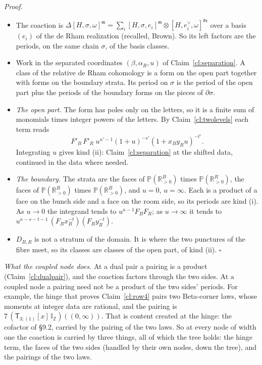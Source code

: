\documentclass[11pt]{article}
\newcommand{\sT}{\mathsf T}
\newcommand{\IZ}{\mathbb I_{\mathbb Z}}
\newcommand{\Tx}[3]{(\sT_{#1;(1)}[x]\,#2)((#3,\infty))}
\theoremstyle{plain}
\theoremstyle{remark}
\begin{document}
\emph{Proof.}
\begin{itemize}
\item The coaction is $\Delta[H,\sigma,\omega]^{\mathfrak m}=\sum_i[H,\sigma,e_i]^{\mathfrak m}\otimes[H,e_i^\vee,\omega]^{\mathfrak{dr}}$ over a basis $(e_i)$ of the de Rham realization (recalled, Brown). So its left factors are the periods, on the same chain $\sigma$, of the basis classes.
\item Work in the separated coordinates $(\beta,\alpha_R,u)$ of Claim~\ref{cl:separation}. A class of the relative de Rham cohomology is a form on the open part together with forms on the boundary strata. Its period on $\sigma$ is the period of the open part plus the periods of the boundary forms on the pieces of $\partial\sigma$.
\item \emph{The open part.} The form has poles only on the letters, so it is a finite sum of monomials times integer powers of the letters. By Claim~\ref{cl:twolevels} each term reads
\[
F'_B\,F'_R\;u^{\kappa'-1}(1+u)^{-s'}(1+x_By_Ru)^{-t'}.
\]
Integrating $u$ gives kind (ii): Claim~\ref{cl:separation} at the shifted data, continued in the data where needed.
\item \emph{The boundary.} The strata are the faces of $\mathbb P(\mathbb R^B_{>0})$ times $\mathbb P(\mathbb R^R_{>0})$, the faces of $\mathbb P(\mathbb R^R_{>0})$ times $\mathbb P(\mathbb R^B_{>0})$, and $u=0$, $u=\infty$. Each is a product of a face on the bunch side and a face on the room side, so its periods are kind (i). As $u\to0$ the integrand tends to $u^{\kappa-1}F_BF_R$; as $u\to\infty$ it tends to $u^{\kappa-s-t-1}\,(F_Bx_B^{-t})(F_Ry_R^{-t})$.
\item $D_{B,R}$ is not a stratum of the domain. It is where the two punctures of the fibre meet, so its classes are classes of the open part, of kind (ii). $\square$
\end{itemize}

\emph{What the coupled node does.} At a dual pair a pairing is a product (Claim~\ref{cl:dualpair}), and the coaction factors through the two sides. At a coupled node a pairing need not be a product of the two sides' periods. For example, the hinge that proves Claim~\ref{cl:row4} pairs two Beta-corner laws, whose moments at integer data are rational, and the pairing is $7\,\Tx3{\IZ}0$. That is content created at the hinge: the cofactor of \S9.2, carried by the pairing of the two laws. So at every node of width one the coaction is carried by three things, all of which the tree holds: the hinge term, the faces of the two sides (handled by their own nodes, down the tree), and the pairings of the two laws.
\end{document}
